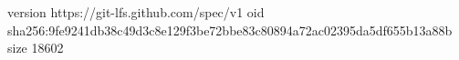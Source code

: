 version https://git-lfs.github.com/spec/v1
oid sha256:9fe9241db38c49d3c8e129f3be72bbe83c80894a72ac02395da5df655b13a88b
size 18602
